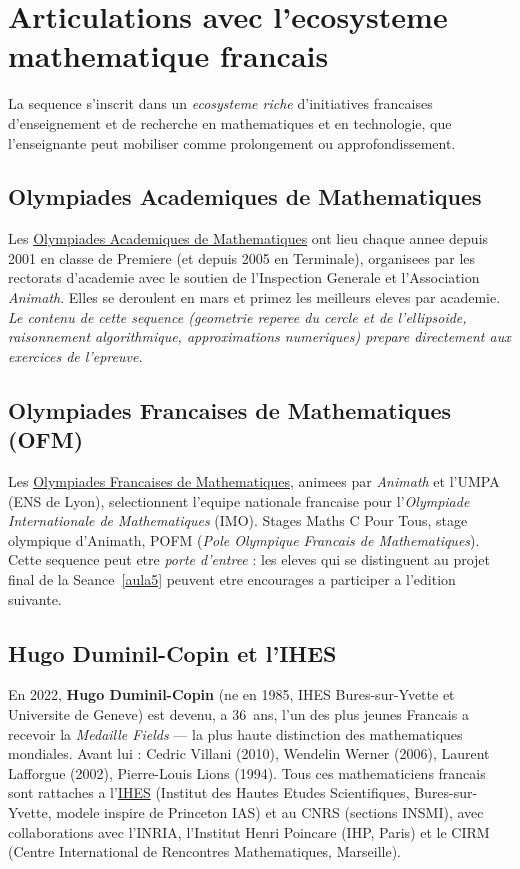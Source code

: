 \documentclass[12pt,a4paper]{scrartcl}
\newcommand{\acc}[1]{\textcolor{accent}{\textbf{#1}}}
\begin{document}
\section{Articulations avec l'ecosysteme mathematique francais}\label{sec:olympiades}

La sequence s'inscrit dans un \emph{ecosysteme riche} d'initiatives francaises d'enseignement et de recherche en mathematiques et en technologie, que l'enseignant\textperiodcentered e peut mobiliser comme prolongement ou approfondissement.

\subsection{Olympiades Academiques de Mathematiques}

Les \href{https://eduscol.education.fr/}{Olympiades Academiques de Mathematiques} ont lieu chaque annee depuis 2001 en classe de Premiere (et depuis 2005 en Terminale), organisees par les rectorats d'academie avec le soutien de l'Inspection Generale et l'Association \emph{Animath}. Elles se deroulent en mars et primez les meilleurs eleves par academie. \emph{Le contenu de cette sequence (geometrie reperee du cercle et de l'ellipsoide, raisonnement algorithmique, approximations numeriques) prepare directement aux exercices de l'epreuve.}

\subsection{Olympiades Francaises de Mathematiques (OFM)}

Les \href{https://www.animath.fr/}{Olympiades Francaises de Mathematiques}, animees par \emph{Animath} et l'UMPA (ENS de Lyon), selectionnent l'equipe nationale francaise pour l'\emph{Olympiade Internationale de Mathematiques} (IMO). Stages Maths C Pour Tous, stage olympique d'Animath, POFM (\emph{Pole Olympique Francais de Mathematiques}). Cette sequence peut etre \emph{porte d'entree} : les eleves qui se distinguent au projet final de la Seance~\ref{aula5} peuvent etre encourages a participer a l'edition suivante.

\subsection{Hugo Duminil-Copin et l'IHES}

En 2022, \acc{Hugo Duminil-Copin} (ne en 1985, IHES Bures-sur-Yvette et Universite de Geneve) est devenu, a 36~ans, l'un des plus jeunes Francais a recevoir la \emph{Medaille Fields} --- la plus haute distinction des mathematiques mondiales. Avant lui : Cedric Villani (2010), Wendelin Werner (2006), Laurent Lafforgue (2002), Pierre-Louis Lions (1994). Tous ces mathematiciens francais sont rattaches a l'\href{https://www.ihes.fr/}{IHES} (Institut des Hautes Etudes Scientifiques, Bures-sur-Yvette, modele inspire de Princeton IAS) et au CNRS (sections INSMI), avec collaborations avec l'INRIA, l'Institut Henri Poincare (IHP, Paris) et le CIRM (Centre International de Rencontres Mathematiques, Marseille).
\end{document}
